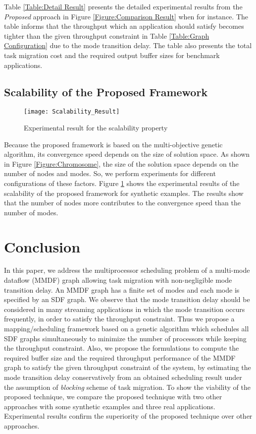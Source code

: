 \documentclass[prodmode,acmtecs]{acmsmall}
\begin{document}
Table \ref{Table:Detail Result} presents the detailed experimental results from the \textit{Proposed} approach in Figure \ref{Figure:Comparison Result} when  for instance. The table informs that the throughput which an application should satisfy becomes tighter than the given throughput constraint in Table \ref{Table:Graph Configuration} due to the mode transition delay. The table also presents the total task migration cost and the required output buffer sizes for benchmark applications.

\subsection{Scalability of the Proposed Framework}
\label{Scalability of the Proposed Framework}

\begin{figure} [ht]
\centerline{\texttt{[image: Scalability\_Result]}}
\caption{Experimental result for the scalability property}
\label{Figure:Scalability Result}
\end{figure}

Because the proposed framework is based on the multi-objective genetic algorithm, its convergence speed depends on the size of solution space. As shown in Figure \ref{Figure:Chromosome}, the size of the solution space depends on the number of nodes and modes. So, we perform experiments for different configurations of these factors. Figure \ref{Figure:Scalability Result} shows the experimental results of the scalability of the proposed framework for synthetic examples. The results show that the number of nodes more contributes to the convergence speed than the number of modes.

\section{Conclusion}
\label{Section:Conclusion}

In this paper, we address the multiprocessor scheduling problem of a multi-mode dataflow (MMDF) graph allowing task migration with non-negligible mode transition delay. An MMDF graph has a finite set of modes and each mode is specified by an SDF graph. We observe that the mode transition delay should be considered in many streaming applications in which the mode transition occurs frequently, in order to satisfy the throughput constraint. Thus we propose a mapping/scheduling framework based on a genetic algorithm which schedules all SDF graphs simultaneously to minimize the number of processors while keeping the throughput constraint. Also, we propose the formulations to compute the required buffer size and the required throughput performance of the MMDF graph to satisfy the given throughput constraint of the system, by estimating the mode transition delay conservatively from an obtained scheduling result under the assumption of \textit{blocking} scheme of task migration.
To show the viability of the proposed technique, we compare the proposed technique with two other approaches with some synthetic examples and three real applications. Experimental results confirm the superiority of the proposed technique over other approaches.
\end{document}
